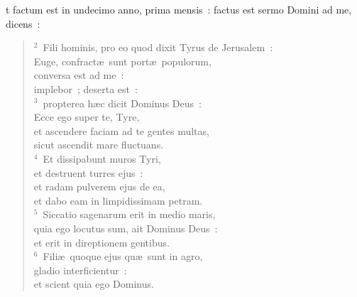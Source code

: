 \bchapter
{}t factum est in undecimo anno, prima mensis~: factus est sermo Domini ad me, dicens~:
\begin{verse}\vspace{6pt}${}^{2}$~Fili hominis, pro eo quod dixit Tyrus de Jerusalem~:\\ Euge, confract\ae\ sunt port\ae\ populorum,\\ conversa est ad me~:\\ implebor~; deserta est~:\\
${}^{3}$~propterea h\ae c dicit Dominus Deus~:\\ Ecce ego super te, Tyre,\\ et ascendere faciam ad te gentes multas,\\ sicut ascendit mare fluctuans.\\
${}^{4}$~Et dissipabunt muros Tyri,\\ et destruent turres ejus~:\\ et radam pulverem ejus de ea,\\ et dabo eam in limpidissimam petram.\\
${}^{5}$~Siccatio sagenarum erit in medio maris,\\ quia ego locutus sum, ait Dominus Deus~:\\ et erit in direptionem gentibus.\\
${}^{6}$~Fili\ae\ quoque ejus qu\ae\ sunt in agro,\\ gladio interficientur~:\\ et scient quia ego Dominus.\end{verse}



